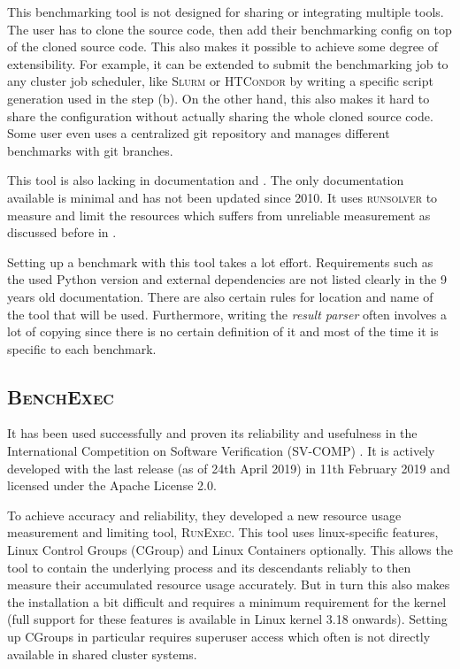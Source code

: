 This benchmarking tool is not designed for sharing or integrating multiple tools.
The user has to clone the source code, then add their benchmarking config on top of the cloned source code.
This also makes it possible to achieve some degree of extensibility.
For example, it can be extended to submit the benchmarking job to any cluster job scheduler, like \textsc{Slurm} \citep{yoo2003slurm} or \textsc{HTCondor} \citep{condor-practice} by writing a specific script generation used in the step (b).
On the other hand, this also makes it hard to share the configuration without actually sharing the whole cloned source code.
Some user even uses a centralized git repository and manages different benchmarks with git branches.

This tool is also lacking in documentation and .
The only documentation available is minimal and has not been updated since 2010.
It uses \textsc{runsolver} to measure and limit the resources which suffers from unreliable measurement as discussed before in .

Setting up a benchmark with this tool takes a lot effort.
Requirements such as the used Python version and external dependencies are not listed clearly in the 9 years old documentation.
There are also certain rules for location and name of the tool that will be used.
Furthermore, writing the \textit{result parser} often involves a lot of copying since there is no certain definition of it and most of the time it is specific to each benchmark.

\subsection{\textsc{BenchExec}}
\label{sec:benchmarking.impl.benchexec}

It has been used successfully and proven its reliability and usefulness in the International Competition on Software Verification (SV-COMP) \citep{beyerReliableBenchmarkingRequirements2019}.
It is actively developed with the last release (as of 24th April 2019) in 11th February 2019 and licensed under the Apache License 2.0.

To achieve accuracy and reliability, they developed a new resource usage measurement and limiting tool, \textsc{RunExec}.
This tool uses linux-specific features, Linux Control Groups (CGroup) and Linux Containers optionally.
This allows the tool to contain the underlying process and its descendants reliably to then measure their accumulated resource usage accurately.
But in turn this also makes the installation a bit difficult and requires a minimum requirement for the kernel (full support for these features is available in Linux kernel 3.18 onwards).
Setting up CGroups in particular requires superuser access which often is not directly available in shared cluster systems.

